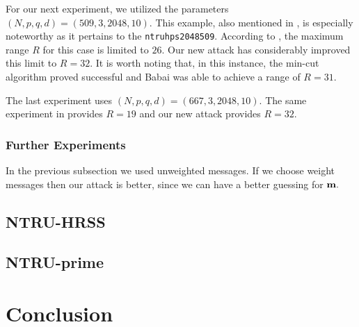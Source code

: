 \documentclass{amsart}
\numberwithin{equation}{section}
\begin{document}
For our next experiment, we utilized the parameters $(N,p,q,d)=(509,3,2048,10)$. This example, also mentioned in \cite[example 5]{adam_draz}, is especially noteworthy as it pertains to the {\texttt{ntruhps2048509}}. According to \cite{adam_draz}, the maximum range $R$ for this case is limited to $26.$ Our new attack has considerably improved this limit to $R=32$. It is worth noting that, in this instance, the min-cut algorithm proved successful and Babai was able to achieve a range of $R=31$.

The last experiment uses $(N,p,q,d)=(667,3,2048,10).$ The same experiment in \cite{adam_draz} provides $R=19$ and our new attack provides $R=32.$ 
\subsubsection{Further Experiments} In the previous subsection we used unweighted messages. If we choose weight messages then our attack is better, since we can have a better  guessing for ${\bf m}.$ 
\subsection{NTRU-HRSS}
\subsection{NTRU-prime}

\section{Conclusion}

\end{document}
